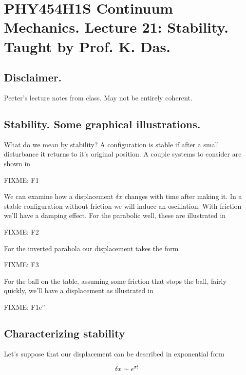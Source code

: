 
%

\chapter{PHY454H1S Continuum Mechanics.  Lecture 21: Stability.  Taught by Prof. K. Das.}
\label{chap:continuumL21}
{}
\date{Mar 29, 2012}

\beginArtWithToc

\section{Disclaimer.}

Peeter's lecture notes from class.  May not be entirely coherent.

\section{Stability.  Some graphical illustrations.}

What do we mean by stability?  A configuration is stable if after a small disturbance it returns to it's original position.  A couple systems to consider are shown in

FIXME: F1

We can examine how a displacement $\delta x$ changes with time after making it.  In a stable configuration without friction we will induce an oscillation.  With friction we'll have a damping effect.  For the parabolic well, these are illustrated in

FIXME: F2

For the inverted parabola our displacement takes the form

FIXME: F3

For the ball on the table, assuming some friction that stops the ball, fairly quickly, we'll have a displacement as illustrated in

FIXME: F1c''

\section{Characterizing stability}

Let's suppose that our displacement can be described in exponential form

\begin{equation}\label{eqn:continuumL21:10}
\delta x \sim e^{\sigma t}
\end{equation}

